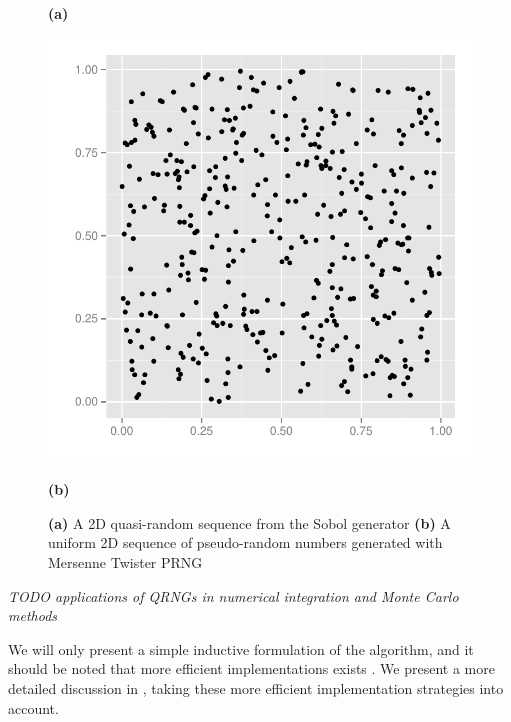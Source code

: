 \documentclass{llncs2e/llncs}
\begin{document}
\begin{figure}
\begin{minipage}{0.45\linewidth}
\begin{center}
      \hspace{0.55cm}\textbf{(a)}
    \end{center}
  \end{minipage}
  \begin{minipage}{0.45\linewidth}
    \begin{center}
      \includegraphics[width=\textwidth]{../report/graphics/2D-mersenne-sequence.pdf}

      \hspace{0.55cm}\textbf{(b)}
    \end{center}
  \end{minipage}

  \caption{\textbf{(a)} A 2D quasi-random sequence from the Sobol
    generator \textbf{(b)} A uniform 2D sequence of pseudo-random
    numbers generated with Mersenne Twister PRNG}
\label{fig:discrepancyplot}
\end{figure}

\emph{TODO applications of QRNGs in numerical integration and Monte Carlo methods}

We will only present a simple inductive formulation of the algorithm,
and it should be noted that more efficient implementations exists
\cite{bratley1988algorithm, hwy2011emerald}. We present a more
detailed discussion in \cite{dybdalcarlsen2013thesis}, taking these
more efficient implementation strategies into account.
\end{document}
